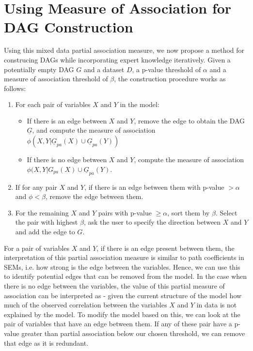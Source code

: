 \documentclass{uai2025} %
\begin{document}
\section{Using Measure of Association for DAG Construction}
\label{sec:modification}

Using this mixed data partial association measure, we now propose a method for
construcing DAGs while incorporating expert knowledge iteratively. Given a
potentially empty DAG $ G $ and a dataset $ D $, a p-value threshold of $
\alpha $ and a measure of association threshold of $ \beta $, the construction
procedure works as follows:

\begin{enumerate}
	\item For each pair of variables $ X $ and $ Y $ in the model:
		\begin{itemize}
			\item If there is an edge between $ X $ and $ Y $, remove the edge to obtain the DAG $ \underline{G} $, and 
				compute the measure of association $ \phi(X, Y \rvert \underline{G}_{pa}(X) \cup \underline{G}_{pa}(Y)) $
			\item If there is no edge between $ X $ and $ Y $, compute the measure of association $ \phi(X, Y \rvert G_{pa}(X) \cup \underline{G}_{pa}(Y) $.
		\end{itemize}
	\item If for any pair $ X $ and $ Y $, if there is an edge between them with p-value $ > \alpha $ and $ \phi < \beta $, remove the edge between them.
	\item For the remaining $ X $ and $ Y $ pairs with p-value $ \geq \alpha $, sort them by $ \beta $. Select the pair with highest $ \beta $, ask the user to specify the direction between $ X $ and $ Y $ and add the edge to $ G $.
\end{enumerate}

For a pair of variables $ X $ and $ Y $, if there is an edge present between
them, the interpretation of this partial association measure is similar to path
coefficients in SEMs, i.e. how strong is the edge between the variables. Hence,
we can use this to identify potential edges that can be removed from the model.
In the case when there is no edge between the variables, the value of this
partial measure of association can be interpreted as - given the current
structure of the model how much of the observed correlation between the
variables $ X $ and $ Y $ in data is not explained by the model. To modify the
model based on this, we can look at the pair of variables that have an edge
between them. If any of these pair have a p-value greater than partial
association below our chosen threshold, we can remove that edge as it is
redundant.
\end{document}
